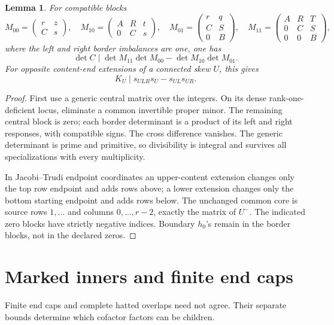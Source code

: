\documentclass[11pt,a4paper]{amsart}
\numberwithin{equation}{section}
\theoremstyle{plain}
\newtheorem{lemma}[theorem]{Lemma}
\theoremstyle{definition}
\begin{document}
\begin{lemma}\label{lem:shared-core}
For compatible blocks
\[
 M_{00}=\begin{pmatrix}r&z\\ C&s\end{pmatrix},\quad
 M_{10}=\begin{pmatrix}A&R&t\\0&C&s\end{pmatrix},\quad
 M_{01}=\begin{pmatrix}r&q\\ C&S\\0&B\end{pmatrix},\quad
 M_{11}=\begin{pmatrix}A&R&T\\0&C&S\\0&0&B\end{pmatrix},
\]
where the left and right border imbalances are one, one has
\[
 \det C\mid\det M_{11}\det M_{00}-\det M_{10}\det M_{01}.
\]
For opposite content-end extensions of a connected skew \(U\), this gives
\[
 K_U\mid s_{ULR}s_U-s_{UL}s_{UR}.
\]
\end{lemma}
\begin{proof}
First use a generic central matrix over the integers.  On its dense rank-one-deficient locus, eliminate a common invertible proper minor.  The remaining central block is zero; each border determinant is a product of its left and right responses, with compatible signs.  The cross difference vanishes.  The generic determinant is prime and primitive, so divisibility is integral and survives all specializations with every multiplicity.

In Jacobi--Trudi endpoint coordinates an upper-content extension changes only the top row endpoint and adds rows above; a lower extension changes only the bottom starting endpoint and adds rows below.  The unchanged common core is source rows \(1,\ldots\) and columns \(0,\ldots,r-2\), exactly the matrix of \(U^-\).  The indicated zero blocks have strictly negative indices.  Boundary \(h_0\)'s remain in the border blocks, not in the declared zeros.
\end{proof}

\section{Marked inners and finite end caps}\label{sec:marks}

Finite end caps and complete hatted overlaps need not agree.  Their separate bounds determine which cofactor factors can be children.
\end{document}
